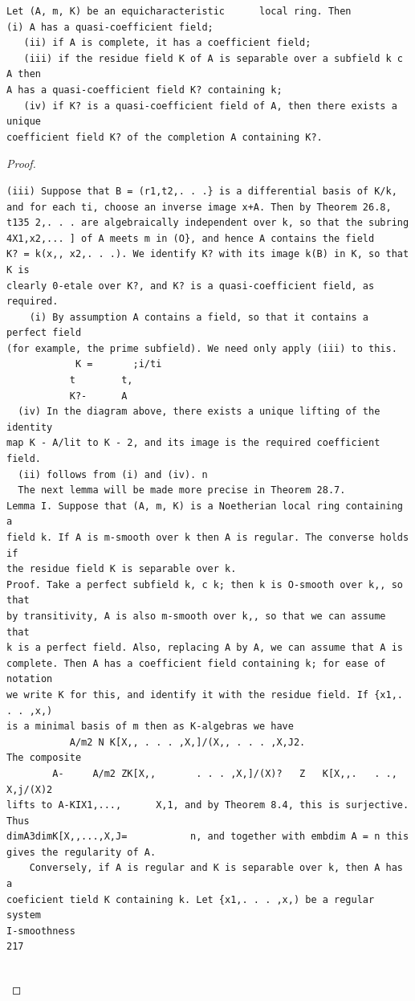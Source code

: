 \begin{theorem}\label{mcrt-auto-theorem-28-3}\uses{}
\begin{verbatim}
Let (A, m, K) be an equicharacteristic      local ring. Then
(i) A has a quasi-coefficient field;
   (ii) if A is complete, it has a coefficient field;
   (iii) if the residue field K of A is separable over a subfield k c A then
A has a quasi-coefficient field K? containing k;
   (iv) if K? is a quasi-coefficient field of A, then there exists a unique
coefficient field K? of the completion A containing K?.
\end{verbatim}
\end{theorem}
\begin{proof}
\begin{verbatim}
(iii) Suppose that B = (r1,t2,. . .} is a differential basis of K/k,
and for each ti, choose an inverse image x+A. Then by Theorem 26.8,
t135 2,. . . are algebraically independent over k, so that the subring
4X1,x2,... ] of A meets m in (O}, and hence A contains the field
K? = k(x,, x2,. . .). We identify K? with its image k(B) in K, so that K is
clearly 0-etale over K?, and K? is a quasi-coefficient field, as required.
    (i) By assumption A contains a field, so that it contains a perfect field
(for example, the prime subfield). We need only apply (iii) to this.
            K =       ;i/ti
           t        t,
           K?-      A
  (iv) In the diagram above, there exists a unique lifting of the identity
map K - A/lit to K - 2, and its image is the required coefficient field.
  (ii) follows from (i) and (iv). n
  The next lemma will be made more precise in Theorem 28.7.
Lemma I. Suppose that (A, m, K) is a Noetherian local ring containing a
field k. If A is m-smooth over k then A is regular. The converse holds if
the residue field K is separable over k.
Proof. Take a perfect subfield k, c k; then k is O-smooth over k,, so that
by transitivity, A is also m-smooth over k,, so that we can assume that
k is a perfect field. Also, replacing A by A, we can assume that A is
complete. Then A has a coefficient field containing k; for ease of notation
we write K for this, and identify it with the residue field. If {x1,. . . ,x,)
is a minimal basis of m then as K-algebras we have
           A/m2 N K[X,, . . . ,X,]/(X,, . . . ,X,J2.
The composite
        A-     A/m2 ZK[X,,       . . . ,X,]/(X)?   Z   K[X,,.   . ., X,j/(X)2
lifts to A-KIX1,...,      X,1, and by Theorem 8.4, this is surjective. Thus
dimA3dimK[X,,...,X,J=           n, and together with embdim A = n this
gives the regularity of A.
    Conversely, if A is regular and K is separable over k, then A has a
coeficient tield K containing k. Let {x1,. . . ,x,) be a regular system
I-smoothness                                                         217


\end{verbatim}
\end{proof}
